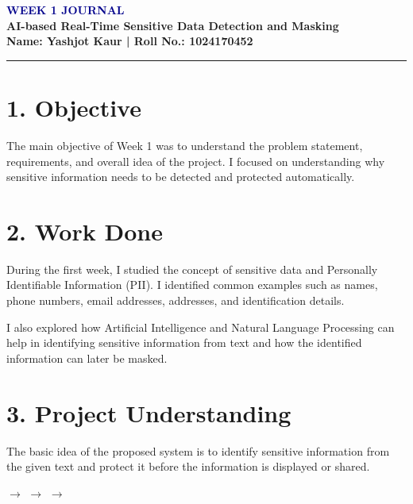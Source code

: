 \documentclass[11pt,a4paper]{article}
\begin{document}
\begin{center}
    {\LARGE \textbf{\textcolor{darkblue}{WEEK 1 JOURNAL}}}\\[5pt]
    
    {\large \textbf{AI-based Real-Time Sensitive Data Detection and Masking}}\\[7pt]
    
    \textbf{Name: Yashjot Kaur \quad | \quad Roll No.: 1024170452}
\end{center}

\vspace{5pt}
\hrule
\vspace{8pt}

\section*{1. Objective}

The main objective of Week 1 was to understand the problem statement,
requirements, and overall idea of the project. I focused on understanding
why sensitive information needs to be detected and protected automatically.

\section*{2. Work Done}

During the first week, I studied the concept of sensitive data and
Personally Identifiable Information (PII). I identified common examples
such as names, phone numbers, email addresses, addresses, and identification
details.

I also explored how Artificial Intelligence and Natural Language Processing
can help in identifying sensitive information from text and how the
identified information can later be masked.

\section*{3. Project Understanding}

The basic idea of the proposed system is to identify sensitive information
from the given text and protect it before the information is displayed or
shared.

\vspace{5pt}

\begin{center}

\hspace{8pt}
$\longrightarrow$
\hspace{8pt}
\hspace{8pt}
$\longrightarrow$
\hspace{8pt}
\hspace{8pt}
$\longrightarrow$
\hspace{8pt}

\end{center}
\end{document}
